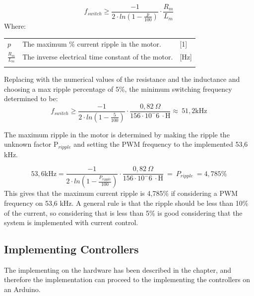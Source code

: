 \begin{equation}
f_{switch} \geq \frac{-1}{2\cdot ln(1-\frac{p}{100})}\cdot\frac{R_{m}}{L_{m}}
\label{eq:PWMSwitch}
\end{equation}
Where:\\
\begin{tabular}{m{8em} m{25em} m{8em}}
$p$& The maximum \% current ripple in the motor. & [1]\\
$\frac{R_{m}}{L_{m}}$& The inverse electrical time constant of the motor.& [Hz]\\
\\
\end{tabular}

Replacing with the numerical values of the resistance and the inductance and choosing a max ripple percentage of 5\%, the minimum switching frequency determined to be:
\begin{equation}
    f_{switch} \geq \frac{-1}{2 \cdot ln(1-\frac{5}{100})}\cdot\frac{0,82\ \Omega}{156\cdot10^-6 \ \cdot \text{H}} \approx \ 51,2 \text{kHz}
\end{equation}

The maximum ripple in the motor is determined by making the ripple the unknown factor P$_{ripple}$ and setting the PWM frequency to the implemented 53,6 kHz.  

\begin{equation}
    53,6 \text{kHz} = \frac{-1}{2 \cdot ln(1-\frac{P_{ripple}}{100})}\cdot\frac{0,82\ \Omega}{156\cdot10^-6 \ \cdot \text{H}}\ =\ P_{ripple}\ = 4,785\%  
\end{equation}
This gives that the maximum current ripple is 4,785\% if considering a PWM frequency on 53,6 kHz. A general rule is that the ripple should be less than 10\% of the current, so considering that is less than 5\% is good considering that the system is implemented with current control.


 
\subsection{Implementing Controllers}
The implementing on the hardware has been described in the chapter, and therefore the implementation can proceed to the implementing the controllers on an Arduino. 



